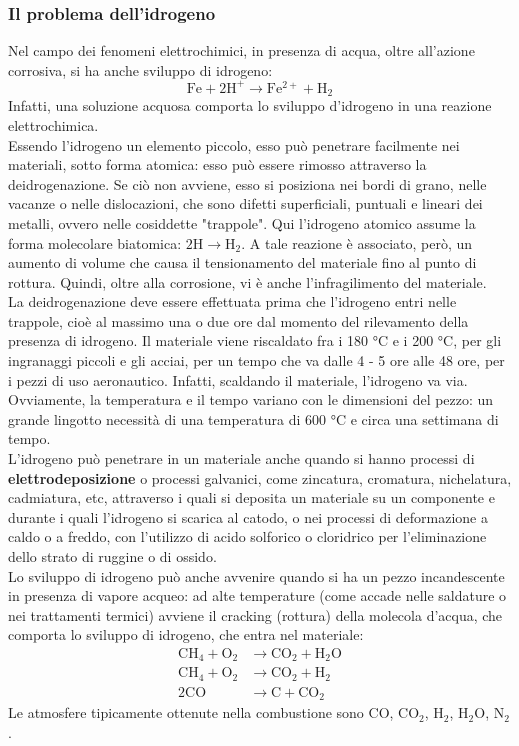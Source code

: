 \subsubsection{Il problema dell'idrogeno}\label{problema idrogeno}
Nel campo dei fenomeni elettrochimici, in presenza di acqua, oltre all’azione corrosiva, si ha anche sviluppo di idrogeno:
\begin{equation*}
    \mathrm{Fe + 2H^+} \to \mathrm{Fe^{2+} + H_2}
\end{equation*}
Infatti, una soluzione acquosa comporta lo sviluppo d’idrogeno in una reazione elettrochimica.\\
Essendo l’idrogeno un elemento piccolo, esso può penetrare facilmente nei materiali, sotto forma atomica: esso può essere rimosso attraverso la deidrogenazione. Se ciò non avviene, esso si posiziona nei bordi di grano, nelle vacanze o nelle dislocazioni, che sono difetti superficiali, puntuali e lineari dei metalli, ovvero nelle cosiddette "trappole". Qui l’idrogeno atomico assume la forma molecolare biatomica: $\mathrm{2H} \to \mathrm{H_2}$. A tale reazione è associato, però, un aumento di volume che causa il tensionamento del materiale fino al punto di rottura. Quindi, oltre alla corrosione, vi è anche l’infragilimento del materiale.\\
La deidrogenazione deve essere effettuata prima che l’idrogeno entri nelle trappole, cioè al massimo una o due ore dal momento del rilevamento della presenza di idrogeno.
Il materiale viene riscaldato fra i 180 °C e i 200 °C, per gli ingranaggi piccoli e gli acciai, per un tempo che va dalle 4 - 5 ore alle 48 ore, per i pezzi di uso aeronautico. Infatti, scaldando il materiale, l’idrogeno va via. Ovviamente, la temperatura e il tempo variano con le dimensioni del pezzo: un grande lingotto necessità di una temperatura di 600 °C e circa una settimana di tempo.\\
L’idrogeno può penetrare in un materiale anche quando si hanno processi di \textbf{elettrodeposizione} o processi galvanici, come zincatura, cromatura, nichelatura, cadmiatura, etc, attraverso i quali si deposita un materiale su un componente e durante i quali l’idrogeno si scarica al catodo, o nei processi di deformazione a caldo o a freddo, con l’utilizzo di acido solforico o cloridrico per l’eliminazione dello strato di ruggine o di ossido.\\
Lo sviluppo di idrogeno può anche avvenire quando si ha un pezzo incandescente in presenza di vapore acqueo: ad alte temperature (come accade nelle saldature o nei trattamenti termici) avviene il cracking (rottura) della molecola d’acqua, che comporta lo sviluppo di idrogeno, che entra nel materiale:
\begin{align*}
    \mathrm{CH_4 + O_2} &\to \mathrm{CO_2 +H_2O}\\
    \mathrm{CH_4 + O_2} &\to \mathrm{CO_2 +H_2} \tag{in rarefazione di ossigeno}\\
    \mathrm{2CO} &\to \mathrm{C + CO_2}
\end{align*}
Le atmosfere tipicamente ottenute nella combustione sono CO, $\mathrm{CO_2}$, $\mathrm{H_2}$, $\mathrm{H_2O}$, $\mathrm{N_2}$.

